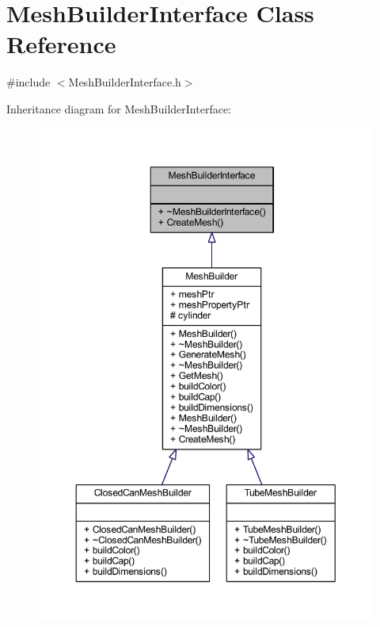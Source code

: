 \hypertarget{class_mesh_builder_interface}{}\section{Mesh\+Builder\+Interface Class Reference}
\label{class_mesh_builder_interface}


{\ttfamily \#include $<$Mesh\+Builder\+Interface.\+h$>$}



Inheritance diagram for Mesh\+Builder\+Interface\+:
\nopagebreak
\begin{figure}[H]
\begin{center}
\leavevmode
\includegraphics[width=350pt]{class_mesh_builder_interface__inherit__graph}
\end{center}
\end{figure}


